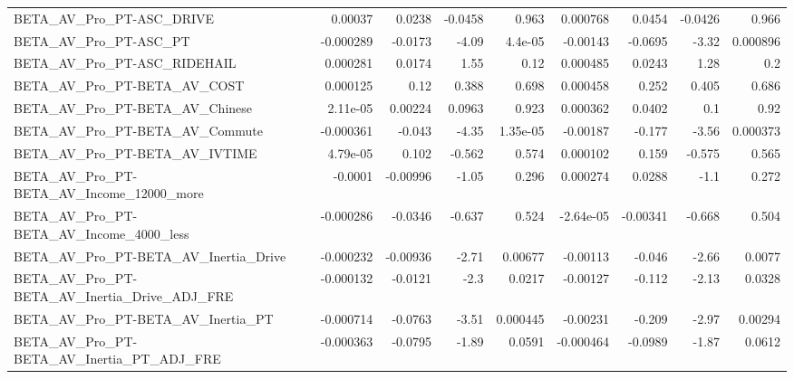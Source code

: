 \begin{tabular}{lrrrrrrrr}
BETA\_AV\_Pro\_PT-ASC\_DRIVE                           &     0.00037 &       0.0238 &  -0.0458 &    0.963 &   0.000768 &      0.0454 &      -0.0426 &         0.966 \\
BETA\_AV\_Pro\_PT-ASC\_PT                              &   -0.000289 &      -0.0173 &    -4.09 &  4.4e-05 &   -0.00143 &     -0.0695 &        -3.32 &      0.000896 \\
BETA\_AV\_Pro\_PT-ASC\_RIDEHAIL                        &    0.000281 &       0.0174 &     1.55 &     0.12 &   0.000485 &      0.0243 &         1.28 &           0.2 \\
BETA\_AV\_Pro\_PT-BETA\_AV\_COST                        &    0.000125 &         0.12 &    0.388 &    0.698 &   0.000458 &       0.252 &        0.405 &         0.686 \\
BETA\_AV\_Pro\_PT-BETA\_AV\_Chinese                     &    2.11e-05 &      0.00224 &   0.0963 &    0.923 &   0.000362 &      0.0402 &          0.1 &          0.92 \\
BETA\_AV\_Pro\_PT-BETA\_AV\_Commute                     &   -0.000361 &       -0.043 &    -4.35 & 1.35e-05 &   -0.00187 &      -0.177 &        -3.56 &      0.000373 \\
BETA\_AV\_Pro\_PT-BETA\_AV\_IVTIME                      &    4.79e-05 &        0.102 &   -0.562 &    0.574 &   0.000102 &       0.159 &       -0.575 &         0.565 \\
BETA\_AV\_Pro\_PT-BETA\_AV\_Income\_12000\_more           &     -0.0001 &     -0.00996 &    -1.05 &    0.296 &   0.000274 &      0.0288 &         -1.1 &         0.272 \\
BETA\_AV\_Pro\_PT-BETA\_AV\_Income\_4000\_less            &   -0.000286 &      -0.0346 &   -0.637 &    0.524 &  -2.64e-05 &    -0.00341 &       -0.668 &         0.504 \\
BETA\_AV\_Pro\_PT-BETA\_AV\_Inertia\_Drive               &   -0.000232 &     -0.00936 &    -2.71 &  0.00677 &   -0.00113 &      -0.046 &        -2.66 &        0.0077 \\
BETA\_AV\_Pro\_PT-BETA\_AV\_Inertia\_Drive\_ADJ\_FRE       &   -0.000132 &      -0.0121 &     -2.3 &   0.0217 &   -0.00127 &      -0.112 &        -2.13 &        0.0328 \\
BETA\_AV\_Pro\_PT-BETA\_AV\_Inertia\_PT                  &   -0.000714 &      -0.0763 &    -3.51 & 0.000445 &   -0.00231 &      -0.209 &        -2.97 &       0.00294 \\
BETA\_AV\_Pro\_PT-BETA\_AV\_Inertia\_PT\_ADJ\_FRE          &   -0.000363 &      -0.0795 &    -1.89 &   0.0591 &  -0.000464 &     -0.0989 &        -1.87 &        0.0612 \\

\end{tabular}
